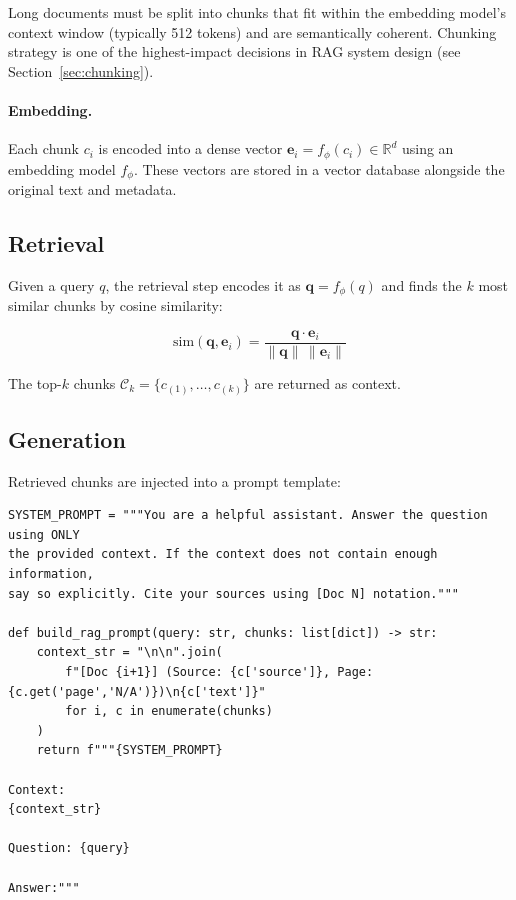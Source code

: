 Long documents must be split into chunks that fit within the embedding model’s context window (typically 512 tokens) and are semantically coherent. Chunking strategy is one of the highest-impact decisions in RAG system design (see Section~\ref{sec:chunking}).

\paragraph{Embedding.}
\label{embedding.}

Each chunk $c_i$ is encoded into a dense vector $\mathbf{e}_i = f_\phi(c_i) \in \mathbb{R}^d$ using an embedding model $f_\phi$. These vectors are stored in a vector database alongside the original text and metadata.

\subsection{Retrieval}
\label{retrieval}

Given a query $q$, the retrieval step encodes it as $\mathbf{q} = f_\phi(q)$ and finds the $k$ most similar chunks by cosine similarity:

\begin{equation}
  \text{sim}(\mathbf{q}, \mathbf{e}_i) = \frac{\mathbf{q} \cdot \mathbf{e}_i}{\|\mathbf{q}\|\,\|\mathbf{e}_i\|}
\end{equation}

The top-$k$ chunks $\mathcal{C}_k = \{c_{(1)}, \ldots, c_{(k)}\}$ are returned as context.

\subsection{Generation}
\label{generation}

Retrieved chunks are injected into a prompt template:

\begin{lstlisting}[style=pythonstyle, caption={Standard RAG prompt template}]
SYSTEM_PROMPT = """You are a helpful assistant. Answer the question using ONLY
the provided context. If the context does not contain enough information,
say so explicitly. Cite your sources using [Doc N] notation."""

def build_rag_prompt(query: str, chunks: list[dict]) -> str:
    context_str = "\n\n".join(
        f"[Doc {i+1}] (Source: {c['source']}, Page: {c.get('page','N/A')})\n{c['text']}"
        for i, c in enumerate(chunks)
    )
    return f"""{SYSTEM_PROMPT}

Context:
{context_str}

Question: {query}

Answer:"""
\end{lstlisting}

